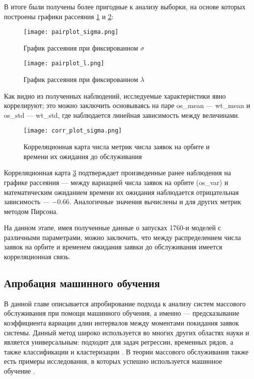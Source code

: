 В итоге были получены более пригодные к анализу выборки, на основе которых построены графики рассеяния \ref{os_wt_pairplot_sigma} и \ref{os_wt_pairplot_l}:

\begin{figure}[H]
	\centering
	\texttt{[image: pairplot\_sigma.png]}
	\caption{График рассеяния при фиксированном $\sigma$} 
	\label{os_wt_pairplot_sigma}
\end{figure}

\begin{figure}[H]
	\centering
	\texttt{[image: pairplot\_l.png]}
	\caption{График рассеяния при фиксированном $\lambda$} 
	\label{os_wt_pairplot_l}
\end{figure}

Как видно из полученных наблюдений, исследуемые характеристики явно коррелируют; это можно заключить основываясь на паре os\_mean --- wt\_mean и os\_std --- wt\_std, где наблюдается линейная зависимость между величинами.

\begin{figure}[H]
	\centering
	\texttt{[image: corr\_plot\_sigma.png]}
	\caption{Корреляционная карта числа метрик числа заявок на орбите и времени их ожидания до обслуживания} 
	\label{os_wt_corr_map}
\end{figure}

Корреляционная карта \ref{os_wt_corr_map} подтверждает произведенные ранее наблюдения на графике рассеяния --- между вариацией числа заявок на орбите (os\_var) и математическим ожиданием времени их ожидания наблюдается отрицательная зависимость --- $-0.66$. Аналогичные значения вычислены и для других метрик методом Пирсона.

На данном этапе, имея полученные данные о запусках 1760-и моделей с различными параметрами, можно заключить, что между распределением числа заявок на орбите и временем ожидания заявки до обслуживания имеется корреляционная связь.

\subsection{Апробация машинного обучения}
В данной главе описывается апробирование подхода к анализу систем массового обслуживания при помощи машинного обучения, а именно --- предсказывание коэффициента вариации длин интервалов между моментами покидания заявок системы. Данный метод широко используется во многих других областях науки и является универсальным: подходит для задач регрессии, временных рядов, а также классификации и кластеризации \cite{libbrecht2015machine,shinde2018review,soofi2017classification}. В теории массового обслуживания также есть примеры исследования, в которых успешно используется машинное обучение \cite{ojeda2021learning,xue2016scheduling,balla2018reliability}.

